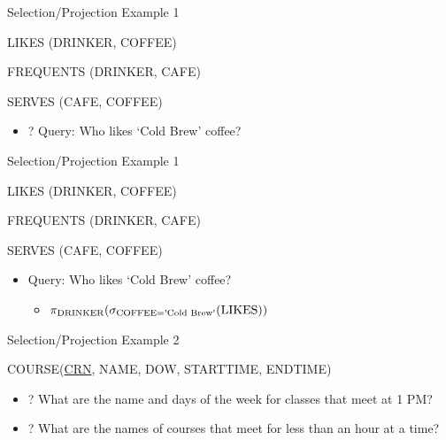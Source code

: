 \documentclass[aspectratio=169]{beamer}
\newenvironment{noindentitemize}
{ \begin{itemize}
 \setlength{\itemsep}{1.5ex}
  \setlength{\parsep}{0pt}   
  \setlength{\parskip}{0pt}
 \addtolength{\leftskip}{-2em}
 }
{ \end{itemize} }
\newenvironment{noindentitemize2}
{ \begin{itemize}
  \setlength{\itemsep}{0ex}
  \setlength{\parskip}{0pt}
  \setlength{\parsep}{0pt}   
  \addtolength{\leftskip}{-2em}  }
{ \end{itemize} }
\newcommand{\LIKES}{\textrm{LIKES}}
\newcommand{\COFFEE}{\textrm{COFFEE}}
\newcommand{\DRINKER}{\textrm{DRINKER}}
\newcommand{\CB}{\textrm{\textquotesingle{Cold Brew}\textquotesingle}}
\begin{document}
\begin{frame}{Selection/Projection Example 1}

LIKES (DRINKER, COFFEE)

FREQUENTS (DRINKER, CAFE)

SERVES (CAFE, COFFEE)

\begin{noindentitemize}
\item[?] Query: Who likes  `Cold Brew' coffee?
\end{noindentitemize}
\end{frame}

\begin{frame}{Selection/Projection Example 1}

LIKES (DRINKER, COFFEE)

FREQUENTS (DRINKER, CAFE)

SERVES (CAFE, COFFEE)

\begin{noindentitemize}
\item Query: Who likes `Cold Brew' coffee?
	\begin{noindentitemize2}
	\item $\pi_{\DRINKER} (\sigma_{\COFFEE = \CB} (\LIKES))$
	\end{noindentitemize2}
\end{noindentitemize}
\end{frame}
\begin{frame}{Selection/Projection Example 2}

COURSE(\underline{CRN}, NAME, DOW, STARTTIME, ENDTIME)

\begin{noindentitemize}
\item[?] What are the name and days of the week for classes that meet at 1 PM?
\item[?] What are the names of courses that meet for less than an hour at a time?


\end{noindentitemize}
\end{frame}
\end{document}
